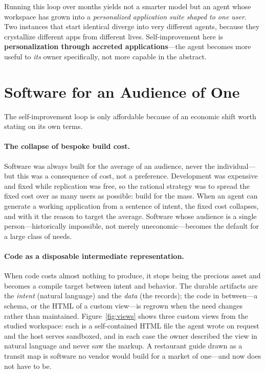 \documentclass[11pt]{article}
\begin{document}
Running this loop over months yields not a smarter model but an agent whose
workspace has grown into a \emph{personalized application suite shaped to one user}.
Two instances that start identical diverge into very different agents, because they
crystallize different apps from different lives. Self-improvement here is
\textbf{personalization through accreted applications}---the agent becomes more
useful to \emph{its} owner specifically, not more capable in the abstract.

\section{Software for an Audience of One}
\label{sec:one}

The self-improvement loop is only affordable because of an economic shift worth
stating on its own terms.

\paragraph{The collapse of bespoke build cost.}
Software was always built for the average of an audience, never the individual---but
this was a consequence of cost, not a preference. Development was expensive and
fixed while replication was free, so the rational strategy was to spread the fixed
cost over as many users as possible: build for the mass. When an agent can generate
a working application from a sentence of intent, the fixed cost collapses, and with
it the reason to target the average. Software whose audience is a single
person---historically impossible, not merely uneconomic---becomes the default for a
large class of needs.

\paragraph{Code as a disposable intermediate representation.}
When code costs almost nothing to produce, it stops being the precious asset and
becomes a compile target between intent and behavior. The durable artifacts are the
\emph{intent} (natural language) and the \emph{data} (the records); the code in
between---a schema, or the HTML of a custom view---is regrown when the need changes
rather than maintained. Figure~\ref{fig:views} shows three custom views from the
studied workspace: each is a self-contained HTML file the agent wrote on request and
the host serves sandboxed, and in each case the owner described the view in natural
language and never saw the markup. A restaurant guide drawn as a transit map is
software no vendor would build for a market of one---and now does not have to be.
\end{document}
